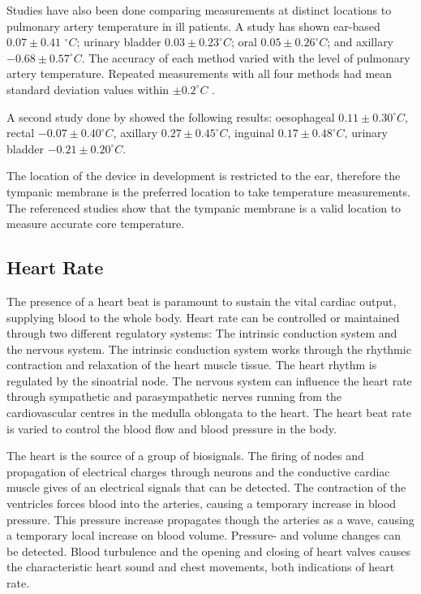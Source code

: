 Studies have also been done comparing measurements at distinct locations to pulmonary artery temperature in ill patients. A study has shown ear-based  $0.07\pm 0.41$  $^{\circ}C$; urinary bladder  $0.03\pm 0.23^{\circ}C$; oral  $0.05\pm 0.26^{\circ}C$; and axillary $-0.68\pm 0.57 ^{\circ}C$. The accuracy of each method varied with the level of pulmonary artery temperature. Repeated measurements with all four methods had mean standard deviation values within $\pm 0.2^{\circ}C$ \citep{erickson1993comparison}.

\medskip
A second study done by \cite{lefrant2003temperature} showed the following results: oesophageal  $0.11 \pm 0.30^{\circ}C$, rectal $-0.07 \pm 0.40^{\circ}C$, axillary $0.27\pm 0.45^{\circ}C$, inguinal $0.17 \pm 0.48^{\circ}C$, urinary bladder $-0.21 \pm 0.20^{\circ}C$.

\medskip
The location of the device in development is restricted to the ear, therefore the tympanic membrane is the preferred location to take temperature measurements. The referenced studies show that the tympanic membrane is a valid location to measure accurate core temperature.

\subsection{Heart Rate}
The presence of a heart beat is paramount to sustain the vital cardiac output, supplying blood to the whole body. Heart rate can be controlled or maintained through two different regulatory systems: The intrinsic conduction system and the nervous system. The intrinsic conduction system works through the rhythmic contraction and relaxation of the heart muscle tissue. The heart rhythm is regulated by the sinoatrial node. The nervous system can influence the heart rate through sympathetic and parasympathetic nerves running from the cardiovascular centres in the medulla oblongata to the heart. The heart beat rate is varied to control the blood flow and blood pressure in the body.

\medskip
The heart is the source of a group of biosignals. The firing of nodes and propagation of electrical charges through neurons and the conductive cardiac muscle gives of an electrical signals that can be detected. The contraction of the  ventricles forces blood into the arteries, causing a temporary increase in blood pressure. This pressure increase propagates though the arteries as a wave, causing a temporary local increase on blood volume. Pressure- and volume changes can be detected. Blood turbulence and the opening and closing of heart valves causes the characteristic heart sound and chest movements, both indications of heart rate.

